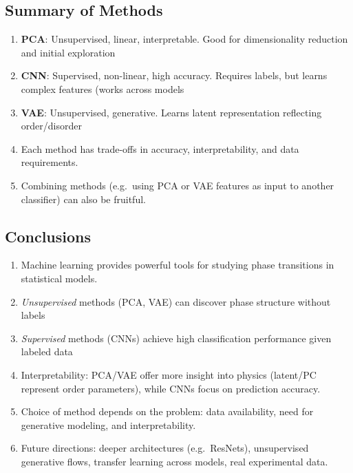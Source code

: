 \documentclass[%
oneside,                 %
final,                   %
10pt]{article}
\begin{document}
\subsection{Summary of Methods}
\begin{enumerate}
\item \textbf{PCA}: Unsupervised, linear, interpretable. Good for dimensionality reduction and initial exploration

\item \textbf{CNN}: Supervised, non-linear, high accuracy. Requires labels, but learns complex features (works across models 

\item \textbf{VAE}: Unsupervised, generative. Learns latent representation reflecting order/disorder 

\item Each method has trade-offs in accuracy, interpretability, and data requirements.

\item Combining methods (e.g.\ using PCA or VAE features as input to another classifier) can also be fruitful.
\end{enumerate}

\noindent
\subsection{Conclusions}
\begin{enumerate}
\item Machine learning provides powerful tools for studying phase transitions in statistical models.

\item \emph{Unsupervised} methods (PCA, VAE) can discover phase structure without labels 

\item \emph{Supervised} methods (CNNs) achieve high classification performance given labeled data 

\item Interpretability: PCA/VAE offer more insight into physics (latent/PC represent order parameters), while CNNs focus on prediction accuracy.

\item Choice of method depends on the problem: data availability, need for generative modeling, and interpretability.

\item Future directions: deeper architectures (e.g.\ ResNets), unsupervised generative flows, transfer learning across models, real experimental data.
\end{enumerate}
\end{document}
